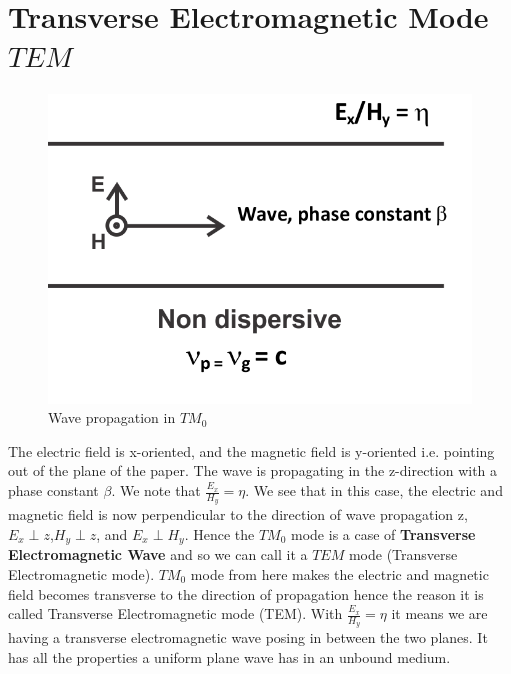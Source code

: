 \section{Transverse Electromagnetic Mode $TEM$}
\begin{figure}[h]
\centering
\includegraphics[width=1\linewidth]{./graphics/silas6}
\caption{Wave propagation in $TM_0$}
\label{fig:silas6}
\end{figure}
The electric field is x-oriented, and the magnetic field is y-oriented i.e. pointing out of the plane of the paper. The wave is propagating in the z-direction with a phase constant $\beta$. We note that $\frac{E_{x}}{H_{y}} = \eta$. We see that in this case, the electric and magnetic field is now perpendicular to the direction of wave propagation z, $E_{x}\perp z$,$H_{y}\perp z$, and $E_{x}\perp H_{y}$. Hence the $TM_0$ mode is a case of \textbf{Transverse Electromagnetic Wave} and so we can call it a $TEM$ mode (Transverse Electromagnetic mode). $TM_0$ mode from here makes the electric and magnetic field becomes transverse to the direction of propagation hence the reason it is called Transverse Electromagnetic mode (TEM). With $\frac{E_{x}}{H_{y}} = \eta$ it means we are having a transverse electromagnetic wave posing in between the two planes. It has all the properties a uniform plane wave has in an unbound medium.

